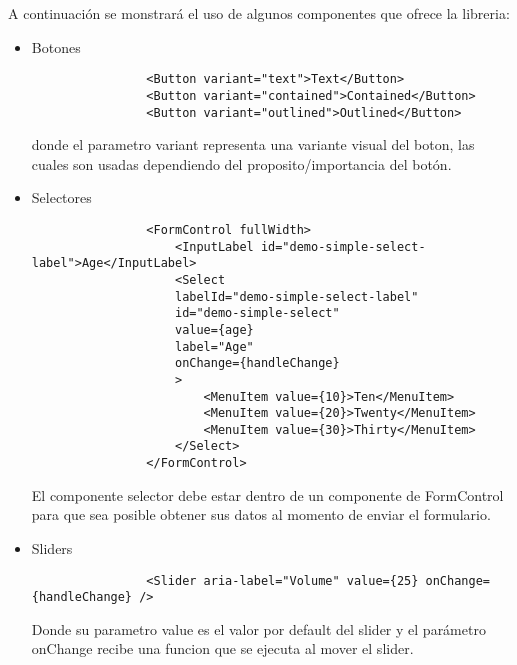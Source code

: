 A continuación se monstrará el uso de algunos componentes que ofrece la libreria:

\begin{itemize}
    \item Botones\\

          \begin{lstlisting}
                <Button variant="text">Text</Button>
                <Button variant="contained">Contained</Button>
                <Button variant="outlined">Outlined</Button>
            \end{lstlisting}

          donde el parametro variant representa una variante visual del boton, las cuales son usadas dependiendo del proposito/importancia del botón.

    \item Selectores\\

          \begin{lstlisting}
                <FormControl fullWidth>
                    <InputLabel id="demo-simple-select-label">Age</InputLabel>
                    <Select
                    labelId="demo-simple-select-label"
                    id="demo-simple-select"
                    value={age}
                    label="Age"
                    onChange={handleChange}
                    >
                        <MenuItem value={10}>Ten</MenuItem>
                        <MenuItem value={20}>Twenty</MenuItem>
                        <MenuItem value={30}>Thirty</MenuItem>
                    </Select>
                </FormControl>
            \end{lstlisting}

          El componente selector debe estar dentro de un componente de FormControl para que sea posible obtener sus datos al momento de enviar el formulario.

    \item Sliders\\

          \begin{lstlisting}
                <Slider aria-label="Volume" value={25} onChange={handleChange} />
            \end{lstlisting}

          Donde su parametro value es el valor por default del slider y el parámetro onChange recibe una funcion que se ejecuta al mover el slider.

\end{itemize}

